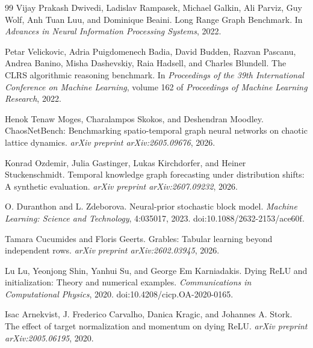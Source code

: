 \begin{thebibliography}{99}
Vijay Prakash Dwivedi, Ladislav Rampasek, Michael Galkin, Ali Parviz, Guy Wolf, Anh Tuan Luu, and Dominique Beaini.
\newblock Long Range Graph Benchmark.
\newblock In \emph{Advances in Neural Information Processing Systems}, 2022.

Petar Velickovic, Adria Puigdomenech Badia, David Budden, Razvan Pascanu, Andrea Banino, Misha Dashevskiy, Raia Hadsell, and Charles Blundell.
\newblock The CLRS algorithmic reasoning benchmark.
\newblock In \emph{Proceedings of the 39th International Conference on Machine Learning}, volume 162 of \emph{Proceedings of Machine Learning Research}, 2022.

Henok Tenaw Moges, Charalampos Skokos, and Deshendran Moodley.
\newblock ChaosNetBench: Benchmarking spatio-temporal graph neural networks on chaotic lattice dynamics.
\newblock \emph{arXiv preprint arXiv:2605.09676}, 2026.

Konrad Ozdemir, Julia Gastinger, Lukas Kirchdorfer, and Heiner Stuckenschmidt.
\newblock Temporal knowledge graph forecasting under distribution shifts: A synthetic evaluation.
\newblock \emph{arXiv preprint arXiv:2607.09232}, 2026.

O. Duranthon and L. Zdeborova.
\newblock Neural-prior stochastic block model.
\newblock \emph{Machine Learning: Science and Technology}, 4:035017, 2023.
\newblock doi:10.1088/2632-2153/ace60f.

Tamara Cucumides and Floris Geerts.
\newblock Grables: Tabular learning beyond independent rows.
\newblock \emph{arXiv preprint arXiv:2602.03945}, 2026.

Lu Lu, Yeonjong Shin, Yanhui Su, and George Em Karniadakis.
\newblock Dying ReLU and initialization: Theory and numerical examples.
\newblock \emph{Communications in Computational Physics}, 2020.
\newblock doi:10.4208/cicp.OA-2020-0165.

Isac Arnekvist, J. Frederico Carvalho, Danica Kragic, and Johannes A. Stork.
\newblock The effect of target normalization and momentum on dying ReLU.
\newblock \emph{arXiv preprint arXiv:2005.06195}, 2020.


\end{thebibliography}
